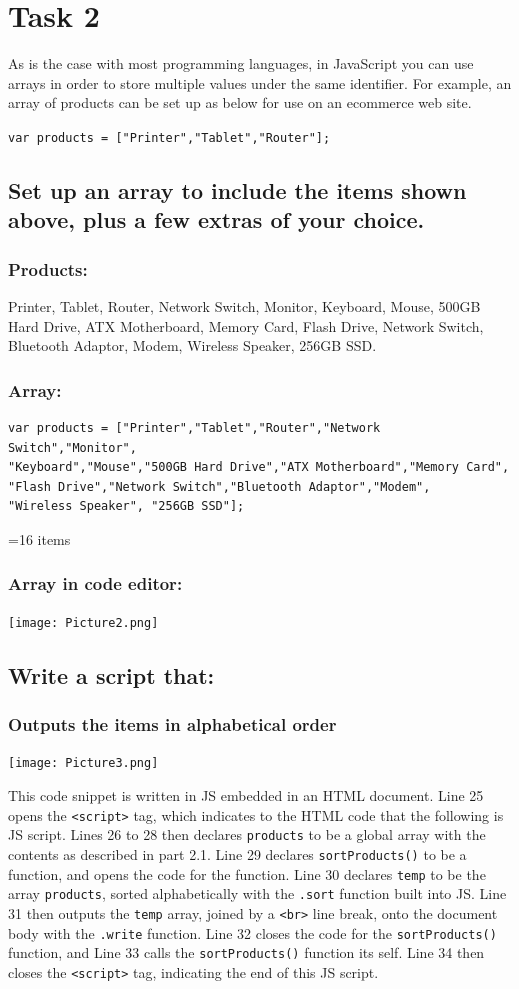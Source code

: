 \documentclass[a4paper]{article}
\begin{document}
\section{Task 2}
As is the case with most programming languages, in JavaScript you can use arrays in order to store multiple values under the same identifier. For example, an array of products can be set up as below for use on an ecommerce web site.\par
  \verb|var products = ["Printer","Tablet","Router"];|
\subsection{Set up an array to include the items shown above, plus a few extras of your choice.}
\subsubsection{Products:}
Printer, Tablet, Router, Network Switch, Monitor, Keyboard, Mouse, 500GB Hard Drive, ATX Motherboard, Memory Card, Flash Drive, Network Switch, Bluetooth Adaptor, Modem, Wireless Speaker, 256GB SSD.
\subsubsection{Array:} 
\begin{lstlisting}
var products = ["Printer","Tablet","Router","Network Switch","Monitor",
"Keyboard","Mouse","500GB Hard Drive","ATX Motherboard","Memory Card",
"Flash Drive","Network Switch","Bluetooth Adaptor","Modem",
"Wireless Speaker", "256GB SSD"];
\end{lstlisting}
=16 items
\subsubsection{Array in code editor:}
\noindent\texttt{[image: Picture2.png]}
\subsection{Write a script that:}
\subsubsection{Outputs the items in alphabetical order}
\noindent\texttt{[image: Picture3.png]} \par
This code snippet is written in JS embedded in an HTML document. Line 25 opens the \verb|<script>| tag, which indicates to the HTML code that the following is JS script. Lines 26 to 28 then declares \verb|products| to be a global array with the contents as described in part 2.1. Line 29 declares \verb|sortProducts()| to be a function, and opens the code for the function. Line 30 declares \verb|temp| to be the array \verb|products|, sorted alphabetically with the \verb|.sort| function built into JS. Line 31 then outputs the \verb|temp| array, joined by a \verb|<br>| line break, onto the document body with the \verb|.write| function. Line 32 closes the code for the \verb|sortProducts()| function, and Line 33 calls the \verb|sortProducts()| function its self. Line 34 then closes the \verb|<script>| tag, indicating the end of this JS script. \newpage
\end{document}
